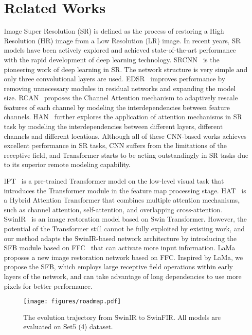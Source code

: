 \documentclass[10pt,twocolumn,letterpaper]{article}
\begin{document}
 \section{Related Works}
Image Super Resolution (SR) is defined as the process of restoring a High Resolution (HR) image from a Low Resolution (LR) image. In recent years, SR models have been actively explored and achieved state-of-the-art performance with the rapid development of deep learning technology. SRCNN~\cite{dong2015image} is the pioneering work of deep learning in SR. The network structure is very simple and only three convolutional layers are used. 
EDSR~\cite{lim2017enhanced} improves performance by removing unnecessary modules in residual networks and expanding the model size. RCAN~\cite{zhang2018image} proposes the Channel Attention mechanism to adaptively rescale features of each channel by modeling the interdependencies between feature channels. 
HAN~\cite{niu2020single} further explores the application of attention mechanisms in SR task by modeling the interdependencies between different layers, different channels and different locations. 
Although all of these CNN-based works achieves excellent performance in SR tasks, CNN suffers from the limitations of the receptive field, and Transformer starts to be acting outstandingly in SR tasks due to its superior remote modeling capability.

IPT~\cite{chen2021pre} is a pre-trained Transformer model on the low-level visual task that introduces the Transformer module in the feature map processing stage.  HAT~\cite{chen2022activating} is a Hybrid Attention Transformer that combines multiple attention mechanisms, such as channel attention, self-attention, and overlapping cross-attention. SwinIR~\cite{liang2021swinir} is an image restoration model based on Swin Transformer. However, the potential of the Transformer still cannot be fully exploited by existing work, and our method adapts the SwinIR-based network architecture by introducing the SFB module based on FFC~\cite{chi2020fast} that can activate more input information. 
LaMa~\cite{suvorov2022resolution} proposes a new image restoration network based on FFC. Inspired by LaMa, we propose the SFB, which employs large receptive field operations within early layers of the network, and can take advantage of long dependencies to use more pixels for better performance.



 
\begin{figure}[t]
	\centering
	\texttt{[image: figures/roadmap.pdf]}
	\vspace{-5mm}
	\caption{The evolution trajectory from SwinIR to SwinFIR. All models are evaluated on Set5 (4) dataset.} 
	\label{fig:roadmap}
	\vspace{-3mm}
\end{figure}
\end{document}
